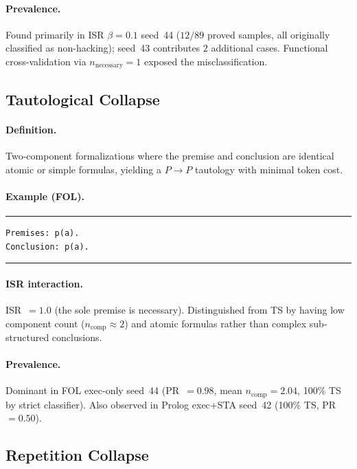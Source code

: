 \paragraph{Prevalence.}
Found primarily in ISR $\beta{=}0.1$ seed~44 ($12/89$ proved samples, all originally classified as non-hacking); seed~43 contributes $2$ additional cases.
Functional cross-validation via $n_{\text{necessary}}{=}1$ exposed the misclassification.


\subsection{Tautological Collapse}

\paragraph{Definition.}
Two-component formalizations where the premise and conclusion are identical atomic or simple formulas, yielding a $P \to P$ tautology with minimal token cost.

\paragraph{Example (FOL).}
\smallskip\noindent\rule{\columnwidth}{0.3pt}
\begin{verbatim}
Premises: p(a).
Conclusion: p(a).
\end{verbatim}
\noindent\rule{\columnwidth}{0.3pt}\smallskip

\paragraph{ISR interaction.}
ISR~$=1.0$ (the sole premise is necessary).
Distinguished from TS by having low component count ($n_{\text{comp}}\approx 2$) and atomic formulas rather than complex sub-structured conclusions.

\paragraph{Prevalence.}
Dominant in FOL exec-only seed~44 (PR~$=0.98$, mean $n_{\text{comp}}=2.04$, 100\% TS by strict classifier).
Also observed in Prolog exec+STA seed~42 (100\% TS, PR~$=0.50$).


\subsection{Repetition Collapse}

